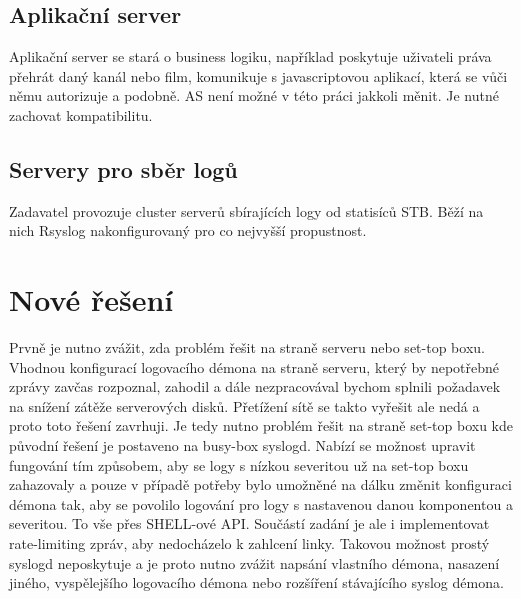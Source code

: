 \documentclass[thesis=B,czech]{FITthesis}[2012/06/26]
\begin{document}
\subsection{Aplikační server}
Aplikační server se stará o business logiku, například poskytuje uživateli práva přehrát daný kanál nebo film, komunikuje s javascriptovou aplikací, která se vůči němu autorizuje a podobně.
AS není možné v této práci jakkoli měnit. Je nutné zachovat kompatibilitu.

\subsection{Servery pro sběr logů}
Zadavatel provozuje cluster serverů sbírajících logy od statisíců STB. Běží na nich Rsyslog nakonfigurovaný pro co nejvyšší propustnost.

\section{Nové řešení}
Prvně je nutno zvážit, zda problém řešit na straně serveru nebo set-top boxu. Vhodnou konfigurací logovacího démona na straně serveru, který by nepotřebné zprávy zavčas rozpoznal, zahodil a dále nezpracovával bychom splnili požadavek na snížení zátěže serverových disků. Přetížení sítě se takto vyřešit ale nedá a proto toto řešení zavrhuji.
Je tedy nutno problém řešit na straně set-top boxu kde původní řešení je postaveno na busy-box syslogd. Nabízí se možnost upravit fungování tím způsobem, aby se logy s nízkou severitou už na set-top boxu zahazovaly a pouze v případě potřeby bylo umožněné na dálku změnit konfiguraci démona tak, aby se povolilo logování pro logy s nastavenou danou komponentou a severitou. To vše přes SHELL-ové API.
Součástí zadání je ale i implementovat rate-limiting zpráv, aby nedocházelo k zahlcení linky. Takovou možnost prostý syslogd neposkytuje a je proto nutno zvážit napsání vlastního démona, nasazení jiného, vyspělejšího logovacího démona nebo rozšíření stávajícího syslog démona.
\end{document}
